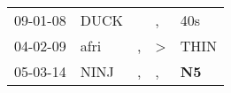 \begin{supertabular}{p{0.07\textwidth}p{0.06\textwidth}p{0.02\textwidth}p{0.02\textwidth}p{0.06\textwidth}}
 09-01-08\textsuperscript{} &  DUCK\textsuperscript{} &    &             , &          40s\textsuperscript{} \\
 04-02-09\textsuperscript{} &  afri\textsuperscript{} &  , &  \textgreater &         THIN\textsuperscript{} \\
 05-03-14\textsuperscript{} &  NINJ\textsuperscript{} &  , &             , &  \textbf{N5\textsuperscript{}} \\
\end{supertabular}
